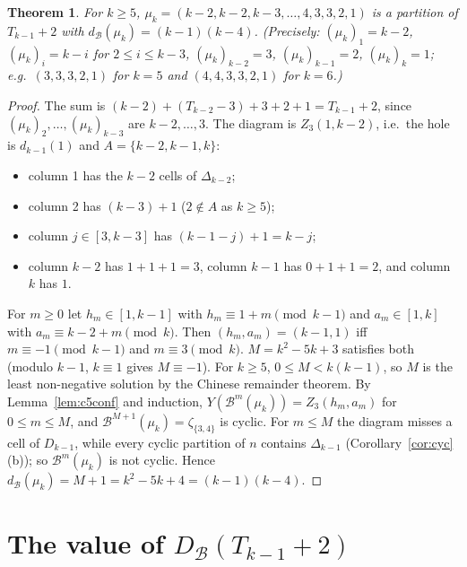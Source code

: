 \documentclass[11pt]{article}
\newtheorem{theorem}{Theorem}[section]
\theoremstyle{definition}
\newcommand{\B}{\mathcal{B}}
\newcommand{\dB}{d_{\mathcal{B}}}
\newcommand{\DB}{D_{\mathcal{B}}}
\renewcommand{\le}{\leqslant}
\renewcommand{\ge}{\geqslant}
\begin{document}
\begin{theorem}\label{thm:c5lower}
For $k\ge5$, $\mu_k=(k-2,k-2,k-3,\dots,4,3,3,2,1)$ is a partition of $T_{k-1}+2$ with
$\dB(\mu_k)=(k-1)(k-4)$.  (Precisely: $(\mu_k)_1=k-2$, $(\mu_k)_i=k-i$ for $2\le i\le k-3$, $(\mu_k)_{k-2}=3$,
$(\mu_k)_{k-1}=2$, $(\mu_k)_k=1$; e.g.\ $(3,3,3,2,1)$ for $k=5$ and $(4,4,3,3,2,1)$ for $k=6$.)
\end{theorem}
\begin{proof}
The sum is $(k-2)+(T_{k-2}-3)+3+2+1=T_{k-1}+2$, since $(\mu_k)_2,\dots,(\mu_k)_{k-3}$ are $k-2,\dots,3$.  The diagram is
$Z_3(1,k-2)$, i.e.\ the hole is $d_{k-1}(1)$ and $A=\{k-2,k-1,k\}$:
\begin{itemize}
\item column 1 has the $k-2$ cells of $\Delta_{k-2}$;
\item column 2 has $(k-3)+1$ ($2\notin A$ as $k\ge5$);
\item column $j\in[3,k-3]$ has $(k-1-j)+1=k-j$;
\item column $k-2$ has $1+1+1=3$, column $k-1$ has $0+1+1=2$, and column $k$ has $1$.
\end{itemize}
For $m\ge0$ let $h_m\in[1,k-1]$ with $h_m\equiv1+m\pmod{k-1}$ and $a_m\in[1,k]$ with $a_m\equiv k-2+m\pmod k$.  Then
$(h_m,a_m)=(k-1,1)$ iff $m\equiv-1\pmod{k-1}$ and $m\equiv3\pmod k$.  $M=k^2-5k+3$ satisfies both (modulo $k-1$,
$k\equiv1$ gives $M\equiv-1$).  For $k\ge5$, $0\le M<k(k-1)$, so $M$ is the least non-negative solution by the Chinese
remainder theorem.  By Lemma~\ref{lem:c5conf} and induction, $Y(\B^m(\mu_k))=Z_3(h_m,a_m)$ for $0\le m\le M$, and
$\B^{M+1}(\mu_k)=\zeta_{\{3,4\}}$ is cyclic.  For $m\le M$ the diagram misses a cell of $D_{k-1}$, while every cyclic
partition of $n$ contains $\Delta_{k-1}$ (Corollary~\ref{cor:cyc}(b)); so $\B^m(\mu_k)$ is not cyclic.  Hence
$\dB(\mu_k)=M+1=k^2-5k+4=(k-1)(k-4)$.
\end{proof}

\section{The value of $\DB(T_{k-1}+2)$}\label{sec:c5main}
\end{document}
